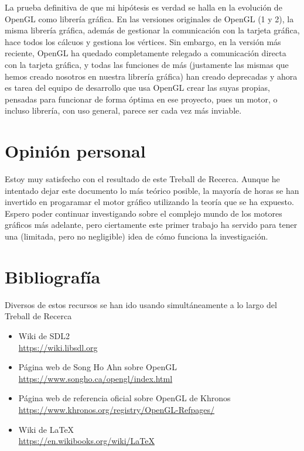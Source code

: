 La prueba definitiva de que mi hipótesis es verdad se halla en la evolución de OpenGL como librería gráfica. En las versiones originales de OpenGL (1 y 2), la misma librería gráfica, además de gestionar la comunicación con la tarjeta gráfica, hace todos los cálcuos y gestiona los vértices. Sin embargo, en la versión más reciente, OpenGL ha quedado completamente relegado a comunicación directa con la tarjeta gráfica, y todas las funciones de más (justamente las mismas que hemos creado nosotros en nuestra librería gráfica) han creado deprecadas y ahora es tarea del equipo de desarrollo que usa OpenGL crear las suyas propias, pensadas para funcionar de forma óptima en ese proyecto, pues un motor, o incluso librería, con uso general, parece ser cada vez más inviable.

\section{Opinión personal}
Estoy muy satisfecho con el resultado de este Treball de Recerca. Aunque he intentado dejar este documento lo más teórico posible, la mayoría de horas se han invertido en progaramar el motor gráfico utilizando la teoría que se ha expuesto. Espero poder continuar investigando sobre el complejo mundo de los motores gráficos más adelante, pero ciertamente este primer trabajo ha servido para tener una (limitada, pero no negligible) idea de cómo funciona la investigación.

\section{Bibliografía}
Diversos de estos recursos se han ido usando simultáneamente a lo largo del Treball de Recerca
\begin{itemize}
\item{Wiki de SDL2 \\ \url{https://wiki.libsdl.org}}
\item{Página web de Song Ho Ahn sobre OpenGL \\\url{https://www.songho.ca/opengl/index.html}}
\item{Página web de referencia oficial sobre OpenGL de Khronos \\\url{https://www.khronos.org/registry/OpenGL-Refpages/}}
  \item{Wiki de \LaTeX \\ \url{https://en.wikibooks.org/wiki/LaTeX}}
\end{itemize}

